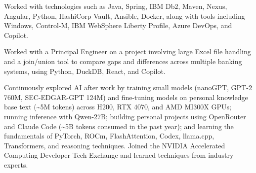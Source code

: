 \begin{cventries}
{\begin{cvitems}
        \item {Worked with technologies such as Java, Spring, IBM Db2, Maven, Nexus, Angular, Python, HashiCorp Vault, Ansible, Docker, along with tools including Windows, Control-M, IBM WebSphere Liberty Profile, Azure DevOps, and Copilot.}
        \item {Worked with a Principal Engineer on a project involving large Excel file handling and a join/union tool to compare gaps and differences across multiple banking systems, using Python, DuckDB, React, and Copilot.}
        \item {Continuously explored AI after work by training small models (nanoGPT, GPT-2 760M, SEC-EDGAR-GPT 124M) and fine-tuning models on personal knowledge base text (\textasciitilde5M tokens) across H200, RTX 4070, and AMD MI300X GPUs; running inference with Qwen-27B; building personal projects using OpenRouter and Claude Code (\textasciitilde5B tokens consumed in the past year); and learning the fundamentals of PyTorch, ROCm, FlashAttention, Codex, llama.cpp, Transformers, and reasoning techniques. Joined the NVIDIA Accelerated Computing Developer Tech Exchange and learned techniques from industry experts.}
      \end{cvitems}
    }


\end{cventries}
